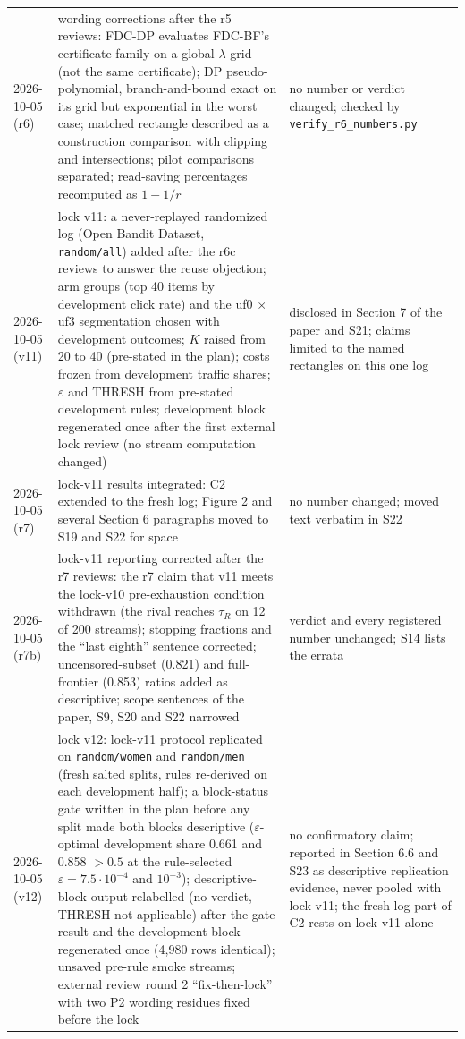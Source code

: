 \documentclass[sigconf,anonymous,review]{acmart}
\newcommand{\eps}{\varepsilon}
\begin{document}
\begin{table}[t]
\begin{tabular}{@{}l>{\raggedright\arraybackslash}p{6.6cm}>{\raggedright\arraybackslash}p{7.6cm}@{}}
2026-10-05 (r6) & wording corrections after the r5 reviews: FDC-DP evaluates FDC-BF's certificate family on a global $\lambda$ grid (not the same certificate); DP pseudo-polynomial, branch-and-bound exact on its grid but exponential in the worst case; matched rectangle described as a construction comparison with clipping and intersections; pilot comparisons separated; read-saving percentages recomputed as $1 - 1/r$ & no number or verdict changed; checked by \texttt{verify\_r6\_numbers.py} \\
2026-10-05 (v11) & lock v11: a never-replayed randomized log (Open Bandit Dataset, \texttt{random/all}) added after the r6c reviews to answer the reuse objection; arm groups (top 40 items by development click rate) and the uf0 $\times$ uf3 segmentation chosen with development outcomes; $K$ raised from 20 to 40 (pre-stated in the plan); costs frozen from development traffic shares; $\eps$ and THRESH from pre-stated development rules; development block regenerated once after the first external lock review (no stream computation changed) & disclosed in Section 7 of the paper and S21; claims limited to the named rectangles on this one log \\
2026-10-05 (r7) & lock-v11 results integrated: C2 extended to the fresh log; Figure 2 and several Section 6 paragraphs moved to S19 and S22 for space & no number changed; moved text verbatim in S22 \\
2026-10-05 (r7b) & lock-v11 reporting corrected after the r7 reviews: the r7 claim that v11 meets the lock-v10 pre-exhaustion condition withdrawn (the rival reaches $\tau_R$ on 12 of 200 streams); stopping fractions and the ``last eighth'' sentence corrected; uncensored-subset (0.821) and full-frontier (0.853) ratios added as descriptive; scope sentences of the paper, S9, S20 and S22 narrowed & verdict and every registered number unchanged; S14 lists the errata \\
2026-10-05 (v12) & lock v12: lock-v11 protocol replicated on \texttt{random/women} and \texttt{random/men} (fresh salted splits, rules re-derived on each development half); a block-status gate written in the plan before any split made both blocks descriptive ($\eps$-optimal development share 0.661 and 0.858 $> 0.5$ at the rule-selected $\eps = 7.5\cdot 10^{-4}$ and $10^{-3}$); descriptive-block output relabelled (no verdict, THRESH not applicable) after the gate result and the development block regenerated once (4,980 rows identical); unsaved pre-rule smoke streams; external review round 2 ``fix-then-lock'' with two P2 wording residues fixed before the lock & no confirmatory claim; reported in Section 6.6 and S23 as descriptive replication evidence, never pooled with lock v11; the fresh-log part of C2 rests on lock v11 alone \\

\end{tabular}
\end{table}
\end{document}
